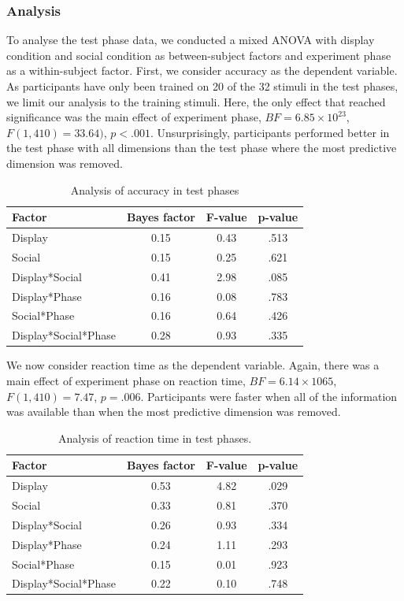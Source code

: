 \documentclass[doc, a4paper, apacite]{apa6}
\begin{document}
\subsubsection{Analysis}
To analyse the test phase data, we conducted a mixed ANOVA with display condition and social condition as between-subject factors and experiment phase as a within-subject factor. 
First, we consider accuracy as the dependent variable. 
As participants have only been trained on 20 of the 32 stimuli in the test phases, we limit our analysis to the training stimuli. 
Here, the only effect that reached significance was the main effect of experiment phase, $BF=6.85 \times 10^{23}$, $F(1, 410)=33.64)$, $p<.001$. 
Unsurprisingly, participants performed better in the test phase with all dimensions than the test phase where the most predictive dimension was removed. 

\begin{table}
	\centering
	\caption{Analysis of accuracy in test phases}
	\label{table:analyisAccuracyTest}
	\begin{tabular}{l c c c}
		\toprule
		Factor & Bayes factor & F-value & p-value \\
		\midrule
		Display & 0.15 & 0.43 & .513 \\
		Social & 0.15 & 0.25 & .621 \\
		Display*Social & 0.41 & 2.98 & .085 \\
		Display*Phase & 0.16 & 0.08 & .783 \\
		Social*Phase & 0.16 & 0.64 & .426 \\
		Display*Social*Phase & 0.28 & 0.93 & .335 \\
		\bottomrule
	\end{tabular}
\end{table}

We now consider reaction time as the dependent variable. 
Again, there was a main effect of experiment phase on reaction time, $BF=6.14 \times 106{5}$, $F(1, 410)=7.47$, $p=.006$. 
Participants were faster when all of the information was available than when the most predictive dimension was removed. 

\begin{table}
	\centering
	\caption{Analysis of reaction time in test phases.}
	\label{table:analyisRTTest}
	\begin{tabular}{l c c c}
		\toprule
		Factor & Bayes factor & F-value & p-value \\
		\midrule
		Display & 0.53 & 4.82 & .029 \\
		Social & 0.33 & 0.81 & .370 \\
		Display*Social & 0.26 & 0.93 & .334 \\
		Display*Phase & 0.24 & 1.11 & .293 \\
		Social*Phase & 0.15 & 0.01 & .923\\
		Display*Social*Phase & 0.22 & 0.10 & .748 \\
		\bottomrule
	\end{tabular}
\end{table}
\end{document}
